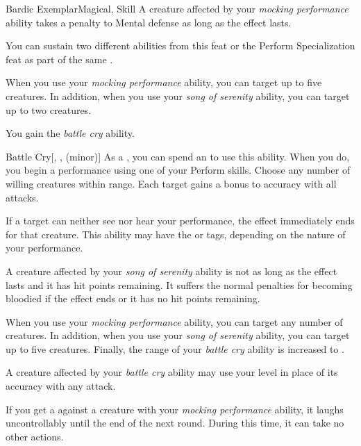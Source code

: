 \begin{feat}{Bardic Exemplar}{Magical, Skill}
         A creature affected by your \textit{mocking performance} ability takes a  penalty to Mental defense as long as the effect lasts.

         You can sustain two different  abilities from this feat or the Perform Specialization feat as part of the same .

         When you use your \textit{mocking performance} ability, you can target up to five creatures.
        In addition, when you use your \textit{song of serenity} ability, you can target up to two creatures.

         You gain the \textit{battle cry} ability.
        \begin{ability}{Battle Cry}[, ,  (minor)]
            As a , you can spend an  to use this ability.
            When you do, you begin a performance using one of your Perform skills.
            Choose any number of willing creatures within \rngmed range.
            Each target gains a  bonus to accuracy with all attacks.

            If a target can neither see nor hear your performance, the effect immediately ends for that creature.
            This ability may have the  or  tags, depending on the nature of your performance.
        \end{ability}

         A creature affected by your \textit{song of serenity} ability is not  as long as the effect lasts and it has hit points remaining.
        It suffers the normal penalties for becoming bloodied if the effect ends or it has no hit points remaining.

         When you use your \textit{mocking performance} ability, you can target any number of creatures.
        In addition, when you use your \textit{song of serenity} ability, you can target up to five creatures.
        Finally, the range of your \textit{battle cry} ability is increased to \rnglong.

         A creature affected by your \textit{battle cry} ability may use your level in place of its accuracy with any attack.

         If you get a  against a creature with your \textit{mocking performance} ability, it laughs uncontrollably until the end of the next round.
        During this time, it can take no other actions.
    \end{feat}


